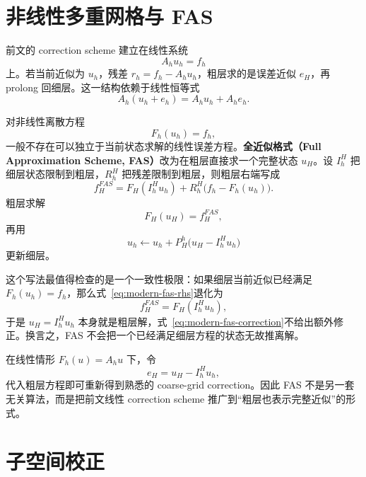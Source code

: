 \section{非线性多重网格与 FAS}
\label{sec:modern-fas}

前文的 correction scheme 建立在线性系统
\begin{equation}
A_h u_h=f_h
\end{equation}
上。若当前近似为 $u_h$，残差 $r_h=f_h-A_hu_h$，粗层求的是误差近似 $e_H$，再 prolong 回细层。这一结构依赖于线性恒等式
\begin{equation}
A_h(u_h+e_h)=A_hu_h+A_he_h.
\end{equation}

对非线性离散方程
\begin{equation}
F_h(u_h)=f_h,
\label{eq:modern-nonlinear-problem}
\end{equation}
一般不存在可以独立于当前状态求解的线性误差方程。\textbf{全近似格式（Full Approximation Scheme, FAS）}改为在粗层直接求一个完整状态 $u_H$。设 $I_h^H$ 把细层状态限制到粗层，$R_h^H$ 把残差限制到粗层，则粗层右端写成
\begin{equation}
f_H^{FAS}
=
F_H(I_h^H u_h)
+
R_h^H\bigl(f_h-F_h(u_h)\bigr).
\label{eq:modern-fas-rhs}
\end{equation}
粗层求解
\begin{equation}
F_H(u_H)=f_H^{FAS},
\end{equation}
再用
\begin{equation}
u_h\leftarrow u_h+P_H^h\bigl(u_H-I_h^H u_h\bigr)
\label{eq:modern-fas-correction}
\end{equation}
更新细层。

这个写法最值得检查的是一个一致性极限：如果细层当前近似已经满足 $F_h(u_h)=f_h$，那么式~\eqref{eq:modern-fas-rhs}退化为
\begin{equation}
f_H^{FAS}=F_H(I_h^H u_h),
\end{equation}
于是 $u_H=I_h^H u_h$ 本身就是粗层解，式~\eqref{eq:modern-fas-correction}不给出额外修正。换言之，FAS 不会把一个已经满足细层方程的状态无故推离解。

在线性情形 $F_h(u)=A_hu$ 下，令
\begin{equation}
e_H=u_H-I_h^H u_h,
\end{equation}
代入粗层方程即可重新得到熟悉的 coarse-grid correction。因此 FAS 不是另一套无关算法，而是把前文线性 correction scheme 推广到“粗层也表示完整近似”的形式。

\section{子空间校正}
\label{sec:modern-subspace-correction}

